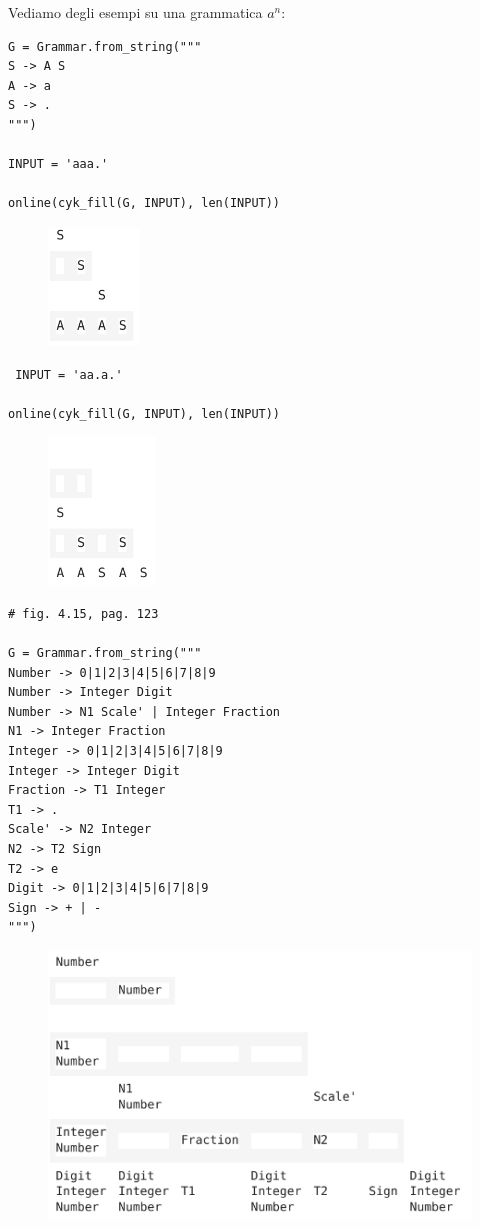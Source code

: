 Vediamo degli esempi su una grammatica $a^n$:
\begin{lstlisting}
G = Grammar.from_string("""
S -> A S
A -> a
S -> .
""")

INPUT = 'aaa.'

online(cyk_fill(G, INPUT), len(INPUT))
\end{lstlisting}

\begin{figure}[ht!]
  \centering
  \includegraphics[scale=1]{images/Parsing/tabellaRes1.png}
\end{figure}

\begin{lstlisting}
 INPUT = 'aa.a.'

online(cyk_fill(G, INPUT), len(INPUT))
\end{lstlisting}

\begin{figure}[ht!]
  \centering
  \includegraphics[scale=1]{images/Parsing/tabellaRes2.png}
\end{figure}

\begin{lstlisting}
# fig. 4.15, pag. 123 

G = Grammar.from_string("""
Number -> 0|1|2|3|4|5|6|7|8|9 
Number -> Integer Digit
Number -> N1 Scale' | Integer Fraction
N1 -> Integer Fraction
Integer -> 0|1|2|3|4|5|6|7|8|9 
Integer -> Integer Digit
Fraction -> T1 Integer
T1 -> .
Scale' -> N2 Integer
N2 -> T2 Sign
T2 -> e
Digit -> 0|1|2|3|4|5|6|7|8|9 
Sign -> + | -
""")
\end{lstlisting}

\begin{figure}[ht!]
  \centering
  \includegraphics[scale=1]{images/Parsing/tabellaResComplesso.png}
\end{figure}


